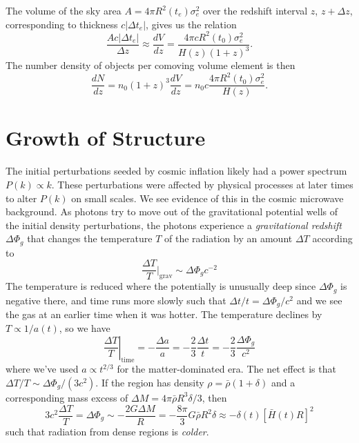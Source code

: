 \documentclass[]{article}
\begin{document}
The volume of the sky area $A = 4\pi R^2(t_e)\sigma_e^2$ over the redshift interval
$z$, $z+\Delta z$, corresponding to thickness $c |\Delta t_e|$, gives us the
relation
\begin{equation}
\frac{A c |\Delta t_e|}{\Delta z} \approx \frac{dV}{dz} = \frac{4\pi c R^2(t_0)\sigma_e^2}{H(z)(1+z)^3}.
\end{equation}
The number density of objects per comoving volume element is then
\begin{equation}
\frac{d N}{dz} = n_0(1+z)^3 \frac{dV}{dz} = n_0 c \frac{4 \pi R^2(t_0)\sigma_e^2}{H(z)}.
\end{equation}


\section{Growth of Structure}

The initial perturbations seeded by cosmic inflation likely had a
power spectrum $P(k) \propto k$.  These perturbations were affected
by physical processes at later times to alter $P(k)$ on small scales.
We see evidence of this in the cosmic microwave background. As
photons try to move out of the gravitational potential wells of the
initial density perturbations, the photons experience a 
{\it gravitational redshift} $\Delta\Phi_g$ that changes the
temperature $T$ of the radiation by an amount $\Delta T$ according
to
\begin{equation}
\frac{\Delta T}{T}|_{\mathrm{grav}} \sim \Delta \Phi_g c^{-2}
\end{equation}
\noindent
The temperature is reduced where the potentially
is unusually deep since $\Delta \Phi_g$ is negative
there, and time runs more slowly such that $\Delta t/t =\Delta \Phi_g/c^2$
and we see the gas at an earlier time when it was hotter.  The temperature
declines by $T\propto 1/ a(t)$, so we have
\begin{equation}
\left.\frac{\Delta T}{T}\right|_{\mathrm{time}} = -\frac{\Delta a}{a} = -\frac{2}{3}\frac{\Delta t}{t} =  -\frac{2}{3}\frac{\Delta \Phi_g}{c^2}
\end{equation}
\noindent
where we've used $a\propto t^{2/3}$ for the matter-dominated era.
The net effect is that $\Delta T/T \sim \Delta \Phi_g / (3 c^2)$.
If the region has density $\rho = \bar{\rho}(1+\delta)$ and a
corresponding mass excess of $\Delta M = 4\pi \bar{\rho}R^3 \delta / 3$,
then 
\begin{equation}
3c^2\frac{\Delta T}{T} = \Delta \Phi_g \sim - \frac{2G\Delta M}{R} = - \frac{8\pi}{3} G \bar{\rho}R^2 \delta \approx - \delta(t)[\bar{H}(t)R]^2
\end{equation}
\noindent
such that radiation from dense regions is {\it colder}.
\end{document}
